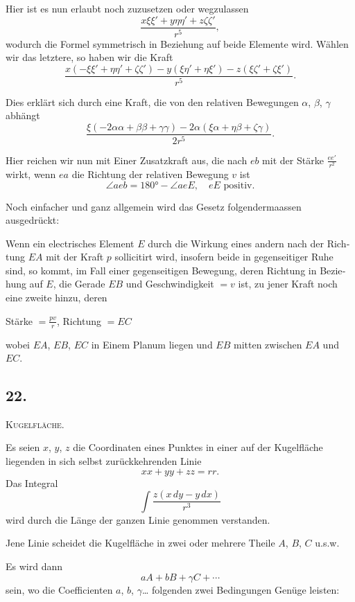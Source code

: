 \documentclass[fontsize=10pt,paper=a5,pagesize=auto]{scrbook}
\newcommand{\origpage}[1]{\marginpar{\footnotesize\textit{S. #1}}}
\begin{document}
Hier ist es nun erlaubt noch zuzusetzen oder wegzulassen
\[
\frac{x\xi\xi' + y\eta\eta' + z\zeta\zeta'}{r^5},
\]
wodurch die Formel symmetrisch in Beziehung auf beide Elemente wird. Wählen wir das letztere, so haben wir die Kraft
\[
\frac{x(-\xi\xi' + \eta\eta' + \zeta\zeta') - y(\xi\eta' + \eta\xi') - z(\xi\zeta' + \zeta\xi')}{r^5}.
\]

Dies erklärt sich durch eine Kraft, die von den relativen Bewegungen $\alpha$, $\beta$, $\gamma$ abhängt
\[
\frac{\xi(-2\alpha\alpha + \beta\beta + \gamma\gamma) - 2\alpha(\xi\alpha + \eta\beta + \zeta\gamma)}{2r^5}.
\]

Hier reichen wir nun mit Einer Zusatzkraft aus, die nach $eb$ mit der Stärke $\frac{ee'}{r^2}$ wirkt, wenn $ea$ die Richtung der relativen Bewegung $v$ ist
\[
\angle aeb = 180° - \angle aeE, \quad eE \text{ positiv.}
\]

Noch einfacher und ganz allgemein wird das Gesetz folgendermaassen ausgedrückt:

\begin{otherlanguage}{ngerman}
Wenn ein electrisches Element $E$ durch die Wirkung eines andern nach der Richtung $EA$ mit der Kraft $p$ sollicitirt wird, insofern beide in gegenseitiger Ruhe sind, so kommt, im Fall einer gegenseitigen Bewegung, deren Richtung in Beziehung auf $E$, die Gerade $EB$ und Geschwindigkeit $= v$ ist, zu jener Kraft noch eine zweite hinzu, deren

Stärke $= \frac{pv}{r}$, Richtung $= EC$
\end{otherlanguage}

wobei $EA$, $EB$, $EC$ in Einem Planum liegen und $EB$ mitten zwischen $EA$ und $EC$.

\subsection*{22.}
\origpage{623}
\textsc{Kugelfläche.}

Es seien $x$, $y$, $z$ die Coordinaten eines Punktes in einer auf der Kugelfläche liegenden in sich selbst zurückkehrenden Linie
\[
xx + yy + zz = rr.
\]
Das Integral
\[
\int \frac{z(x \, dy - y \, dx)}{r^3}
\]
wird durch die Länge der ganzen Linie genommen verstanden.

Jene Linie scheidet die Kugelfläche in zwei oder mehrere Theile $A$, $B$, $C$ u.s.w.

Es wird dann
\[
a A + b B + \gamma C + \cdots
\]
sein, wo die Coefficienten $a$, $b$, $\gamma$\dots{} folgenden zwei Bedingungen Genüge leisten:
\end{document}
